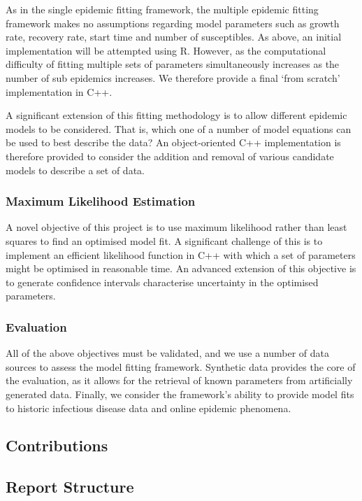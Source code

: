 \documentclass[11pt, a4paper, oneside,titlepage]{article}
\begin{document}
As in the single epidemic fitting framework, the multiple epidemic
fitting framework makes no assumptions regarding model parameters such
as growth rate, recovery rate, start time and number of
susceptibles. As above, an initial implementation will be attempted
using R. However, as the computational difficulty of fitting
multiple sets of parameters simultaneously increases as the number of
sub epidemics increases. We therefore provide a final `from scratch' implementation in C++.

A significant extension of this fitting methodology is to allow
different epidemic models to be considered. That is, which one of a
number of model equations can be used to best describe the data? An
object-oriented C++ implementation is therefore provided to consider
the addition and removal of various candidate models to describe a set
of data.

\subsubsection{Maximum Likelihood Estimation}
A novel objective of this project is to use maximum likelihood rather
than least squares to find an optimised model fit. A significant
challenge of this is to implement an efficient likelihood function in
C++ with which a set of parameters might be optimised in reasonable
time. An advanced extension of this objective is to generate confidence
intervals characterise uncertainty in the optimised parameters. 

\subsubsection{Evaluation}
All of the above objectives must be validated, and we use a
number of data sources to assess the model fitting
framework. Synthetic data provides the core of the evaluation, as it
allows for the retrieval of known parameters from artificially
generated data. Finally, we consider the framework's ability to
provide model fits to historic infectious disease data and online
epidemic phenomena.


\subsection{Contributions}


\subsection{Report Structure}
\end{document}
